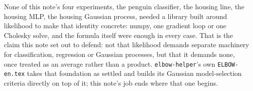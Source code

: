 \documentclass[11pt]{article}
\newcommand{\code}[1]{\texttt{#1}}
\begin{document}
None of this note's four experiments, the penguin classifier, the
housing line, the housing MLP, the housing Gaussian process, needed a
library built around likelihood to make that identity concrete: numpy,
one gradient loop or one Cholesky solve, and the formula itself were
enough in every case. That is the claim this note set out to defend:
not that likelihood demands separate machinery for classification,
regression or Gaussian processes, but that it demands none, once
treated as an average rather than a product. \code{elbow-helper}'s own
\code{ELBOW-en.tex} takes that foundation as settled and builds its
Gaussian model-selection criteria directly on top of it; this note's
job ends where that one begins.

\clearpage


\end{document}
